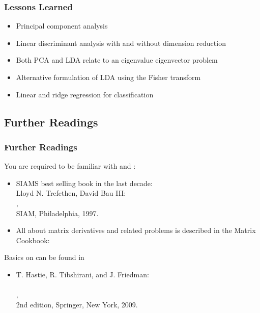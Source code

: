 \begin{frame}
	\frametitle{Lessons Learned}

	\begin{itemize}
		\item Principal component analysis \\[.5cm]
		\item Linear discriminant analysis with and without dimension reduction \\[.5cm]
		\item Both PCA and LDA relate to an eigenvalue eigenvector problem \\[.5cm]
		\item Alternative formulation of LDA using the Fisher transform \\[.5cm]
		\item Linear and ridge regression for classification
	\end{itemize}
\end{frame}



\subsection{Further Readings}

\begin{frame}
	\frametitle{Further Readings}

	You are required to be familiar with  and :

	\begin{itemize}
		\item SIAMS best selling book in the last decade:\\[.15cm]
		      Lloyd N. Trefethen, David Bau III: \\
		      , \\
		      SIAM, Philadelphia, 1997. \\[0.15cm]
		\item All about matrix derivatives and related problems is described in the Matrix Cookbook:
		       \\[.3cm]
	\end{itemize}

	Basics on  can be found in

	\begin{itemize}
		\item T. Hastie, R. Tibshirani, and J. Friedman: \\
		      \\
		      ,\\
		      2nd edition, Springer, New York, 2009.
	\end{itemize}
\end{frame}


